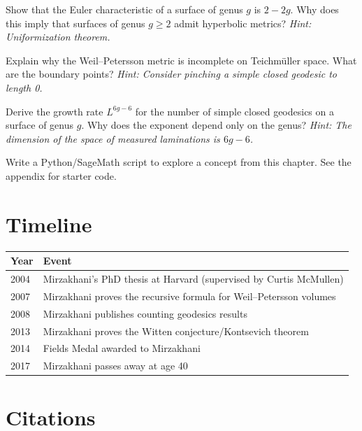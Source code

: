 \begin{exercise}[Basic]
Show that the Euler characteristic of a surface of genus $g$ is $2 - 2g$. Why does this imply that surfaces of genus $g \geq 2$ admit hyperbolic metrics? \emph{Hint: Uniformization theorem.}
\end{exercise}

\begin{exercise}[Intermediate]
Explain why the Weil--Petersson metric is incomplete on Teichm\"uller space. What are the boundary points? \emph{Hint: Consider pinching a simple closed geodesic to length 0.}
\end{exercise}

\begin{exercise}[Challenge]
Derive the growth rate $L^{6g-6}$ for the number of simple closed geodesics on a surface of genus $g$. Why does the exponent depend only on the genus? \emph{Hint: The dimension of the space of measured laminations is $6g-6$.}
\end{exercise}


\begin{exercise}[Computational]
Write a Python/SageMath script to explore a concept from this chapter. See the appendix for starter code.
\end{exercise}

\section{Timeline}

\begin{tabularx}{\linewidth}{lX}
\toprule
\textbf{Year} & \textbf{Event} \\ \midrule
2004 & Mirzakhani's PhD thesis at Harvard (supervised by Curtis McMullen) \\ 
2007 & Mirzakhani proves the recursive formula for Weil--Petersson volumes \cite{mirzakhani2007} \\ 
2008 & Mirzakhani publishes counting geodesics results \cite{mirzakhani2008} \\ 
2013 & Mirzakhani proves the Witten conjecture/Kontsevich theorem \cite{mirzakhani2013} \\ 
2014 & Fields Medal awarded to Mirzakhani \\ 
2017 & Mirzakhani passes away at age 40 \\ \bottomrule
\end{tabularx}

\section{Citations}


